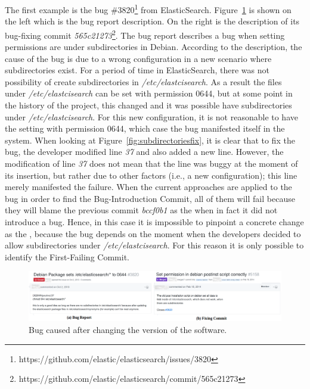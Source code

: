 \documentclass[a4paper, 12pt]{book}
\begin{document}
The first example is the bug \#3820\footnote{https://github.com/elastic/elasticsearch/issues/3820} from ElasticSearch. Figure~\ref{fig:subdirectories} is shown on the left which is the bug report description. On the right is the description of its bug-fixing commit  \emph{565c21273}\footnote{https://github.com/elastic/elasticsearch/commit/565c21273}. The bug report describes a bug when setting permissions are under subdirectories in Debian. According to the description, the cause of the bug is due to a wrong configuration in a new scenario where subdirectories exist. For a period of time in ElasticSearch, there was not possibility of create subdirectories in \emph{/etc/elastcisearch}. As a result the files under \emph{/etc/elastcisearch} can be set with permission 0644, but at some point in the history of the project, this changed and it was possible have subdirectories under \emph{/etc/elastcisearch}. For this new configuration, it is not reasonable to have the setting with permission 0644, which case the bug manifested itself in the system. When looking at Figure~\ref{fig:subdirectoriesfix}, it is clear that to fix the bug, the developer modified line \emph{37} and also added a new line. However, the modification of line \emph{37} does not mean that the line was buggy at the moment of its insertion, but rather due to other factors (i.e., a new configuration); this line merely manifested the failure. When the current approaches are applied to the bug in order to find the Bug-Introduction Commit, all of them will fail because they will blame the previous commit \emph{bccf0b1} as the \BIC when in fact it did not introduce a bug. Hence, in this case it is impossible to pinpoint a concrete change as the \BIC, because the bug depends on the moment when the developers decided to allow subdirectories under \emph{/etc/elastcisearch}.  For this reason it is only possible to identify the First-Failing Commit. 

\begin{figure}[ht]
\centering
\includegraphics[width=\columnwidth]{img/subdirectories.png}
\caption{Bug caused after changing the version of the software.}
\label{fig:subdirectories}       %
\end{figure}
\end{document}
